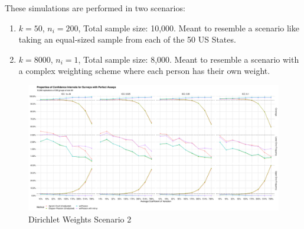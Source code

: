 \documentclass{article}
\begin{document}
These simulations are performed in two scenarios:

\begin{enumerate}
    \item \( k = 50 \), \( n_i = 200 \), Total sample size: 10,000. Meant to resemble a scenario like taking an equal-sized sample from each of the 50 US States.
    \item \( k = 8000 \), \( n_i = 1 \), Total sample size: 8,000. Meant to resemble a scenario with a complex weighting scheme where each person has their own weight.
\end{enumerate}

\begin{landscape}
\begin{figure}
    \centering
    \includegraphics[width = \paperwidth]{figures/results_plot_200_50.pdf}
    \caption{Dirichlet Weights Scenario 2}
    \label{fig:dws2}
\end{figure}
\end{landscape}
\pagebreak


\end{document}
